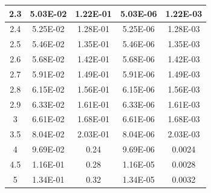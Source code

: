 \documentclass[11pt, a4paper, twocolumn]{article}
\begin{document}
\begin{longtable}[c]{|
>{\columncolor[HTML]{EFEFEF}}c |c|c|c|c|}
2.3                & 5.03E-02                               & 1.22E-01                                & 5.03E-06                               & 1.22E-03                                \\ \hline
2.4                & 5.25E-02                               & 1.28E-01                                & 5.25E-06                               & 1.28E-03                                \\ \hline
2.5                & 5.46E-02                               & 1.35E-01                                & 5.46E-06                               & 1.35E-03                                \\ \hline
2.6                & 5.68E-02                               & 1.42E-01                                & 5.68E-06                               & 1.42E-03                                \\ \hline
2.7                & 5.91E-02                               & 1.49E-01                                & 5.91E-06                               & 1.49E-03                                \\ \hline
2.8                & 6.15E-02                               & 1.56E-01                                & 6.15E-06                               & 1.56E-03                                \\ \hline
2.9                & 6.33E-02                               & 1.61E-01                                & 6.33E-06                               & 1.61E-03                                \\ \hline
3                  & 6.61E-02                               & 1.68E-01                                & 6.61E-06                               & 1.68E-03                                \\ \hline
3.5                & 8.04E-02                               & 2.03E-01                                & 8.04E-06                               & 2.03E-03                                \\ \hline
4                  & 9.69E-02                               & 0.24                                    & 9.69E-06                               & 0.0024                                  \\ \hline
4.5                & 1.16E-01                               & 0.28                                    & 1.16E-05                               & 0.0028                                  \\ \hline
5                  & 1.34E-01                               & 0.32                                    & 1.34E-05                               & 0.0032                                  \\ \hline

\end{longtable}
\end{document}
